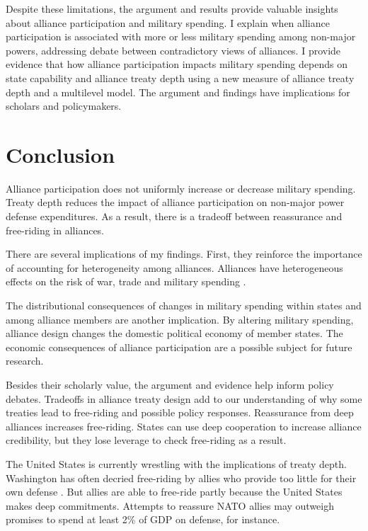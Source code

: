 \documentclass[12pt]{article}
\begin{document}
Despite these limitations, the argument and results provide valuable insights about alliance participation and military spending. 
I explain when alliance participation is associated with more or less military spending among non-major powers, addressing debate between contradictory views of alliances.  
I provide evidence that how alliance participation impacts military spending depends on state capability and alliance treaty depth using a new measure of alliance treaty depth and a multilevel model. 
The argument and findings have implications for scholars and policymakers. 


\section*{Conclusion}

Alliance participation does not uniformly increase or decrease military spending. 
Treaty depth reduces the impact of alliance participation on non-major power defense expenditures. 
As a result, there is a tradeoff between reassurance and free-riding in alliances. 


There are several implications of my findings.  
First, they reinforce the importance of accounting for heterogeneity among alliances.
Alliances have heterogeneous effects on the risk of war, trade and military spending \citep{Leeds2003, LongLeeds2006, Benson2012, DigiuseppePoast2016}. 


The distributional consequences of changes in military spending within states and among alliance members are another implication.  
By altering military spending, alliance design changes the domestic political economy of member states. 
The economic consequences of alliance participation are a possible subject for future research. 


Besides their scholarly value, the argument and evidence help inform policy debates. 
Tradeoffs in alliance treaty design add to our understanding of why some treaties lead to free-riding and possible policy responses. 
Reassurance from deep alliances increases free-riding. 
States can use deep cooperation to increase alliance credibility, but they lose leverage to check free-riding as a result. 


The United States is currently wrestling with the implications of treaty depth. 
Washington has often decried free-riding by allies who provide too little for their own defense \citep{Lanoszka2015}. 
But allies are able to free-ride partly because the United States makes deep commitments. 
Attempts to reassure NATO allies may outweigh promises to spend at least 2\% of GDP on defense, for instance.
\end{document}
